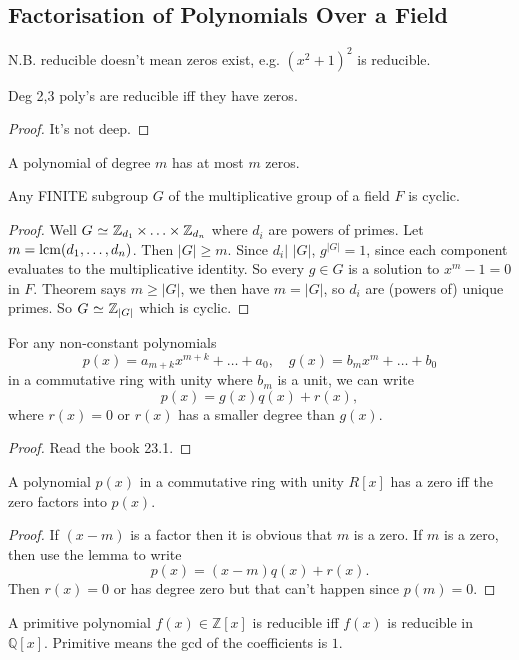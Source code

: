 \subsection*{Factorisation of Polynomials Over a Field}
N.B. reducible doesn't mean zeros exist, e.g. $(x^2+1)^2$ is reducible.
\begin{theorem}
Deg 2,3 poly's are reducible iff they have zeros.
\end{theorem}
\begin{proof}
It's not deep.
\end{proof}
\begin{theorem}
A polynomial of degree $m$ has at most $m$ zeros.
\end{theorem}
\begin{cor}
Any FINITE subgroup $G$ of the multiplicative group of a field $F$ is cyclic.
\end{cor}
\begin{proof}
Well $G \operatorname{\,\simeq\,} \operatorname{\mathbb{Z}}_{d_1} \times \hdots \times \operatorname{\mathbb{Z}}_{d_n}$ where $d_i$ are powers of primes. Let $m = \operatorname{lcm}(d_1,\hdots,d_n)$. Then $|G| \geq m$. Since $d_i \vert \,\,|G|$, $g^{|G|} = 1$, since each component evaluates to the multiplicative identity. So every $g \in G$ is a solution to $x^m-1 = 0$ in $F$.
Theorem says $m \geq |G|$, we then have $m = |G|$, so $d_i$ are (powers of) unique primes. So $G \operatorname{\,\simeq\,} \operatorname{\mathbb{Z}}_{|G|}$ which is cyclic.
\end{proof}
\begin{lemma}
For any non-constant polynomials $$p(x) = a_{m+k}x^{m+k}+\hdots+a_0,\quad g(x) = b_mx^m+\hdots+b_0$$
in a commutative ring with unity where $b_m$ is a unit,
we can write
$$
p(x) = g(x)q(x)+r(x),
$$
where $r(x) = 0$ or $r(x)$ has a smaller degree than $g(x)$.
\end{lemma}
\begin{proof}
Read the book 23.1.
\end{proof}
\begin{theorem}\label{thm:factor}
A polynomial $p(x)$ in a commutative ring with unity $R[x]$
has a zero iff the zero factors into $p(x)$.
\end{theorem}
\begin{proof}
If $(x-m)$ is a factor then it is obvious that $m$ is a zero.
If $m$ is a zero, then use the lemma to write $$
p(x) = (x-m)q(x)+r(x).
$$
Then $r(x)=0$ or has degree zero but that can't happen since $p(m) = 0$.
\end{proof}
\begin{theorem}\label{thm:rational-root}
A primitive polynomial $f(x) \in \mathbb{Z}[x]$ is reducible iff $f(x)$ is reducible in $\mathbb{Q}[x]$. Primitive means the gcd of the coefficients is $1$.
\end{theorem}
